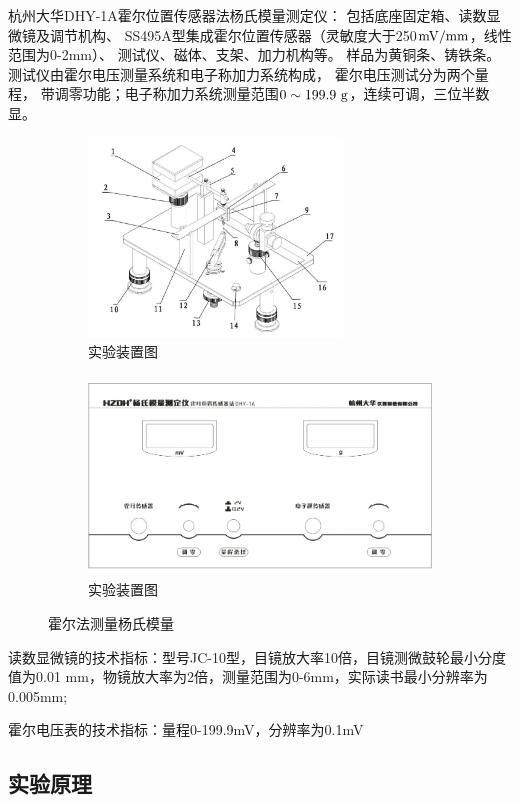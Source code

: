 \documentclass[UTF8]{article}
\theoremstyle{MyLineTheoremStyle} %
\theoremstyle{MyBlockTheoremStyle} %
\theoremstyle{MySubsubsectionStyle} %
\begin{document}
杭州大华DHY-1A霍尔位置传感器法杨氏模量测定仪：
包括底座固定箱、读数显微镜及调节机构、
SS495A型集成霍尔位置传感器（灵敏度大于250$\rm mV/mm$，线性范围为0-2mm）、
测试仪、磁体、支架、加力机构等。
样品为黄铜条、铸铁条。
测试仪由霍尔电压测量系统和电子称加力系统构成，
霍尔电压测试分为两个量程，
带调零功能；电子称加力系统测量范围$0\sim199.9\,\,{\rm g}$，连续可调，三位半数显。

\begin{figure}[H]\centering
\begin{subfigure}[b]{0.4\columnwidth}\centering
    \includegraphics[height=150pt]{assets/0/image (19).png}
    \caption{实验装置图}
\end{subfigure}\hfill
\begin{subfigure}[b]{0.6\columnwidth}\centering
    \includegraphics[height=150pt]{assets/0/image (20).png}
    \caption{实验装置图}
\end{subfigure}
\caption{霍尔法测量杨氏模量}
\end{figure}

读数显微镜的技术指标：型号JC-10型，目镜放大率10倍，目镜测微鼓轮最小分度值为0.01 mm，物镜放大率为2倍，测量范围为0-6mm，实际读书最小分辨率为0.005mm;

霍尔电压表的技术指标：量程0-199.9mV，分辨率为0.1mV

\subsection{实验原理}
\end{document}
